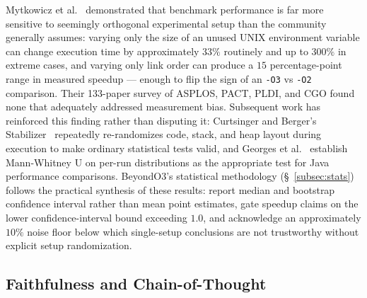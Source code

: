 Mytkowicz et al.~\cite{mytkowicz2009producing} demonstrated that benchmark performance is far more sensitive to seemingly orthogonal experimental setup than the community generally assumes: varying only the size of an unused UNIX environment variable can change execution time by approximately $33\%$ routinely and up to $300\%$ in extreme cases, and varying only link order can produce a $15$ percentage-point range in measured speedup --- enough to flip the sign of an \texttt{-O3} vs \texttt{-O2} comparison. Their 133-paper survey of ASPLOS, PACT, PLDI, and CGO found none that adequately addressed measurement bias. Subsequent work has reinforced this finding rather than disputing it: Curtsinger and Berger's Stabilizer~\cite{curtsinger2013stabilizer} repeatedly re-randomizes code, stack, and heap layout during execution to make ordinary statistical tests valid, and Georges et al.~\cite{georges2007statistical} establish Mann-Whitney U on per-run distributions as the appropriate test for Java performance comparisons. BeyondO3's statistical methodology (\S~\ref{subsec:stats}) follows the practical synthesis of these results: report median and bootstrap confidence interval rather than mean point estimates, gate speedup claims on the lower confidence-interval bound exceeding $1.0$, and acknowledge an approximately $10\%$ noise floor below which single-setup conclusions are not trustworthy without explicit setup randomization.

\subsection{Faithfulness and Chain-of-Thought}

